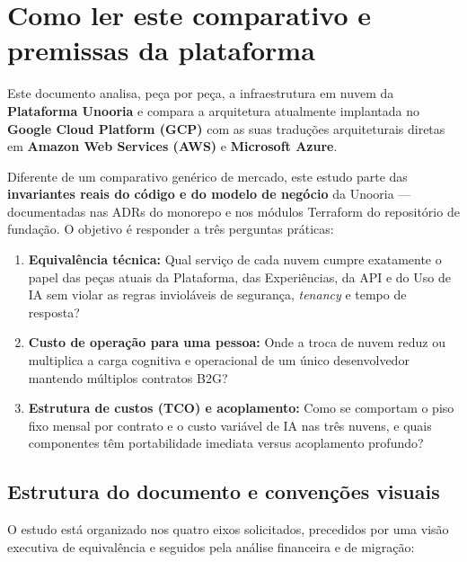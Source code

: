 \chapter{Como ler este comparativo e premissas da plataforma}
\label{cap:como-ler}

Este documento analisa, peça por peça, a infraestrutura em nuvem da
\textbf{Plataforma Unooria} e compara a arquitetura atualmente implantada no
\textbf{Google Cloud Platform (GCP)} com as suas traduções arquiteturais diretas
em \textbf{Amazon Web Services (AWS)} e \textbf{Microsoft Azure}.

Diferente de um comparativo genérico de mercado, este estudo parte das
\textbf{invariantes reais do código e do modelo de negócio} da Unooria ---
documentadas nas ADRs do monorepo e nos módulos Terraform do repositório de
fundação. O objetivo é responder a três perguntas práticas:

\begin{enumerate}
  \item \textbf{Equivalência técnica:} Qual serviço de cada nuvem cumpre
    exatamente o papel das peças atuais da Plataforma, das Experiências, da API
    e do Uso de IA sem violar as regras invioláveis de segurança, \emph{tenancy}
    e tempo de resposta?
  \item \textbf{Custo de operação para uma pessoa:} Onde a troca de nuvem reduz
    ou multiplica a carga cognitiva e operacional de um único desenvolvedor
    mantendo múltiplos contratos B2G?
  \item \textbf{Estrutura de custos (TCO) e acoplamento:} Como se comportam o
    piso fixo mensal por contrato e o custo variável de IA nas três nuvens, e
    quais componentes têm portabilidade imediata versus acoplamento profundo?
\end{enumerate}

\section{Estrutura do documento e convenções visuais}

O estudo está organizado nos quatro eixos solicitados, precedidos por uma visão
executiva de equivalência e seguidos pela análise financeira e de migração:

